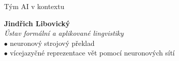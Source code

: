\documentclass[aspectratio=169,dvipsnames]{beamer}
\begin{document}
\begin{frame}{Tým AI v kontextu}
    \hspace{80pt}\begin{minipage}{70pt}
    \end{minipage}\begin{minipage}{250pt}
        \textbf{Jindřich Libovický} \\
        \textit{Ústav formální a aplikované lingvistiky} \\
        \quad$\bullet$ neuronový strojový překlad \\
        \quad$\bullet$ vícejazyčné reprezentace vět pomocí neuronových sítí
    \end{minipage}

\end{frame}





%
%
%
%
%
%
\end{document}
